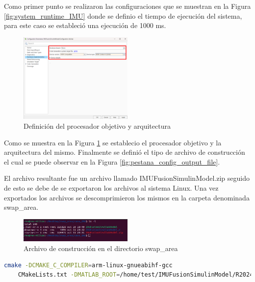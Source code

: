 Como primer punto se realizaron las configuraciones que se muestran en la Figura \ref{fig:system_runtime_IMU} donde se definio el tiempo de ejecución del sistema, para este caso se estableció una ejecución de 1000 ms. 

\begin{figure}[h!]
    \centering
    \includegraphics[width=0.5\textwidth]{fig/aditional/procesador_imu.pdf}
    \caption{Definición del procesador objetivo y arquitectura}
    \label{fig:system_target_IMU}
\end{figure}

Como se muestra en la Figura \ref{fig:system_target_IMU} se establecio el procesador objetivo y la arquitectura del mismo. Finalmente se definió el tipo de archivo de construcción el cual se puede observar en la Figura \ref{fig:pestana_config_output_file}. 

El archivo resultante fue un archivo llamado IMUFusionSimulinModel.zip seguido de esto se debe de  se exportaron los archivos al sistema Linux. Una vez exportados los archivos se descomprimieron los mismos en la carpeta denominada swap\_area.

\begin{figure}[h!]
    \centering
    \includegraphics[width=0.5\textwidth]{fig/Capitulo5/Caso_de_estudio_IMU/retornos_consola/Screenshot from 2024-10-31 20-33-27.png}
    \caption{Archivo de construcción en el directorio swap\_area}
    \label{fig:swap_area_imu}
\end{figure}

\begin{lstlisting}[language=bash, caption={Compilacion del programa , Linux}, label=lst:build_cmake_file_IMU]
    cmake -DCMAKE_C_COMPILER=arm-linux-gnueabihf-gcc 
    CMakeLists.txt -DMATLAB_ROOT=/home/test/IMUFusionSimulinModel/R2024b/
\end{lstlisting}

